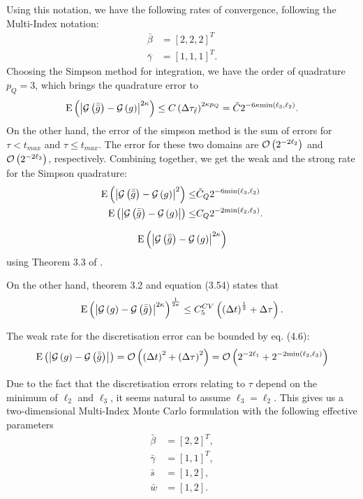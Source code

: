 \documentclass[11pt]{amsart}
\begin{document}
Using this notation, we have the following rates of convergence, following the Multi-Index notation:
\begin{align}
\bar \beta &= [2,2,2]^T \\
\bar \gamma &= [1,1,1]^T .
\end{align} 
Choosing the Simpson method for integration, we have the order of quadrature $p_Q=3$, which brings the quadrature error to 
\begin{align}
\mathrm{E} \left( {{\left| {\mathcal G\left( {\bar{\bar g}} \right) - \mathcal G \left( {g} \right)} \right|^{2 \kappa}}} \right) \leq C \left( {\Delta \tau_{\bar \ell}} \right)^{2 \kappa p_Q} = 
\tilde C 2^{-6 \kappa \mathrm{min} \left( {\ell_3,\ell_2} \right)}.
\end{align}
On the other hand, the error of the simpson method is the sum of errors for $\tau < t_{max}$ and $\tau \leq t_{max}$. The error for these two domains are $\mathcal O \left( {{2^{-2 \ell_2}}} \right)$ and $\mathcal O \left( {{2^{-2 \ell_3}}} \right)$, respectively. Combining together, we get the weak and the strong rate
for the Simpson quadrature:
\begin{align}
\mathrm{E} \left( {{\left| {\mathcal G\left( {\bar{\bar g}} \right) - \mathcal G \left( {g} \right)} \right|^{2}}} \right) \leq&  \tilde C_Q 2^{-6 \mathrm{min} \left( {\ell_3,\ell_2} \right)}
\\
\mathrm{E} \left( {{\left| {\mathcal G\left( {\bar{\bar g}} \right) - \mathcal G \left( {g} \right)} \right|}} \right) \leq& C_Q 2^{-2 \mathrm{min} \left( {\ell_2,\ell_3} \right)}.
\end{align}

\begin{align}
\mathrm{E} \left( {{\left| {\mathcal G\left( {\bar{\bar g}} \right) - \mathcal G \left( {g} \right)} \right|^{2 \kappa}}} \right)
\end{align}
using Theorem 3.3 of \cite{bjork2013monte}.

On the other hand, theorem 3.2 and equation (3.54) states that
\begin{align}
\mathrm{E} \left( {{ \left| { \mathcal G \left( {g} \right) - \mathcal G \left( {\bar{\bar g}} \right) } \right|^{2 \kappa}  }} \right) ^{\frac{1}{2 \kappa}} \leq C_{5}^{CV} \left( { \left( {\Delta t} \right)^{\frac{1}{2}} + \Delta \tau } \right).
\end{align}

The weak rate for the discretisation error can be bounded by eq. (4.6):
\begin{align}
\mathrm{E} \left( {{ \left| { \mathcal G \left( {g} \right) - \mathcal G \left( {\bar{\bar g}} \right) } \right|^{}  }} \right)
= 
 \mathcal O \left( {{\left( {\Delta t} \right)^2 + \left( {\Delta \tau} \right)^2}} \right)
 = \mathcal O \left( {{2^{-2 \ell_1} + 2^{-2 \mathrm {min} \left( {\ell_2,\ell_3} \right) }}} \right)
\end{align}

Due to the fact that the discretisation errors relating to $\tau$
depend on the minimum of $\ell_2$ and $\ell_3$, it seems natural
to assume $\ell_3=\ell_2$. This gives us a two-dimensional
Multi-Index Monte Carlo formulation with the following effective parameters
\begin{align}
\bar \beta &= [2,2]^T ,\\
\bar \gamma &= [1,1]^T , \\
\bar s &= [1,2], \\
\bar w & = [1,2].
\end{align}
\end{document}
